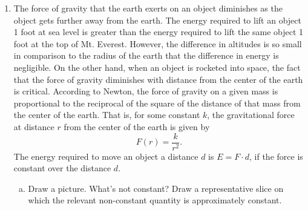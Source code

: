 \documentclass[12pt]{article}
\newcommand{\red}[1]{ \textcolor{red}{#1 } }
\begin{document}
\begin{enumerate}
\begin{enumerate}[(a)]
\item Evaluate the integral, assign it the proper units, and explain the meaning of your result.\\
Hint: Check that \(r  - \ln(1 + r)\) is an antiderivative of $\dfrac{r}{1+r}$.

\red{
\begin{align*} 
\int_0^{10000} \frac{50}{1 + r} 2\pi r\, dr 
& = 100\pi \int_0^{10000} \frac{r}{1 + r}\ dr \\ 
&  = 100\pi (r - \ln(1 + r)) \bigg|_0^{10000}\\ 
& = 100\pi(10000 - \ln(10001))\\ & = \SI{3.1386e6}{kg}
\end{align*}
So, the total mass of the slick is $\SI{3.1386e6}{kg}.$
}

\item Is more than half, or less than half, of the oil contained within a 5,000 m radius? 
\red{
\begin{align*} 
\int_0^{5000} \frac{50}{1 + r} 2\pi r\, dr 
& = 100\pi \int_0^{5000} \frac{r}{1 + r}\ dr \\ 
&  = 100\pi (r - \ln(1 + r)) \bigg|_0^{5000}\\ 
& = 100\pi(5000 - \ln(5001))\\ & = \SI{1.56812e6}{kg}
\end{align*}This is slightly less than half of the oil.
}
\end{enumerate}

\item The force of gravity that the earth exerts on an object diminishes as the object gets further away from the earth. The energy required to lift an object 1 foot at sea level is greater than the energy required to lift the same object 1 foot at the top of Mt. Everest. However, the difference in altitudes is so small in comparison to the radius of the earth that the difference in energy is negligible. On the other hand, when an object is rocketed into space, the fact that the force of gravity diminishes with distance from the center of the earth is critical. According to Newton, the force of gravity on a given mass is proportional to the reciprocal of the square of the distance of that mass from the center of the earth. That is, for some constant \(k\), the gravitational force at distance \(r\) from the center of the earth is given by 
\[ F(r) = \frac{k}{r^2}.\]
The energy required to move an object a distance \(d\) is \(E = F\cdot d\), if the force is constant over the distance \(d\).  
\begin{enumerate}[(a)]
\item Draw a picture. What's not constant? Draw a representative slice on which the relevant non-constant quantity is approximately constant. 


\end{enumerate}
\end{enumerate}
\end{document}
